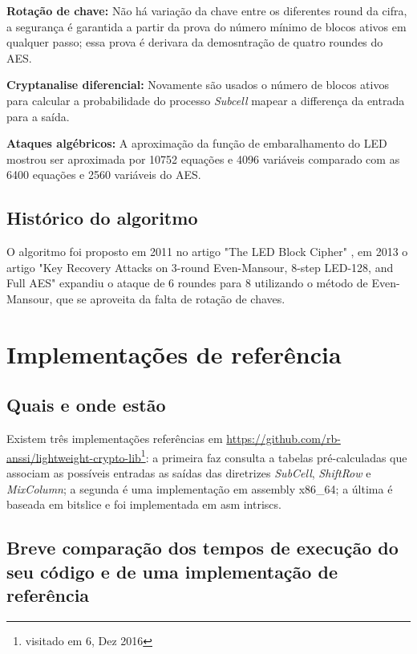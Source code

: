 \documentclass[runningheads,a4paper,11pt]{llncs}
\begin{document}
\noindent\textbf{Rota\c{c}\~ao de chave:} N\~ao h\'a varia\c{c}\~ao da chave entre os diferentes round da cifra, a seguran\c{c}a \'e garantida a partir da prova do n\'umero m\'inimo de blocos ativos em qualquer passo; essa prova \'e derivara da demosntra\c{c}\~ao de quatro roundes do AES.

\noindent\textbf{Cryptanalise diferencial:} Novamente s\~ao usados o n\'umero de blocos ativos para calcular a probabilidade do processo \textit{Subcell} mapear a differen\c{c}a da entrada para a sa\'ida.

\noindent\textbf{Ataques alg\'ebricos:} A aproxima\c{c}\~ao da fun\c{c}\~ao de embaralhamento do LED mostrou ser aproximada por 10752 equa\c{c}\~oes e 4096 vari\'aveis comparado com as 6400 equa\c{c}\~oes e 2560 vari\'aveis do AES.
	
\subsection{Hist\'orico do algoritmo}
O algoritmo foi proposto em 2011 no artigo "The LED Block Cipher" \cite{Guo2011}, em 2013 o artigo "Key Recovery Attacks on 3-round Even-Mansour, 8-step LED-128, and Full AES" \cite{Dinur2013} expandiu o ataque de 6 roundes para 8 utilizando o m\'etodo de Even-Mansour, que se aproveita da falta de rota\c{c}\~ao de chaves.

\section{Implementa\c{c}\~oes de refer\^encia}

\subsection{Quais e onde est\~ao}

Existem tr\^es implementa\c{c}\~oes refer\^encias em \url{https://github.com/rb-anssi/lightweight-crypto-lib}\footnote{visitado em 6, Dez 2016}: a primeira faz consulta a tabelas pr\'e-calculadas que associam as poss\'iveis entradas as sa\'idas das diretrizes \textit{SubCell}, \textit{ShiftRow} e \textit{MixColumn}; a segunda \'e uma implementa\c{c}\~ao em assembly x86\_64; a \'ultima \'e baseada em bitslice e foi implementada em asm intriscs.

\subsection{Breve compara\c{c}\~ao dos tempos de execu\c{c}\~ao do seu c\'odigo e de uma implementa\c{c}\~ao de refer\^encia}
\end{document}

